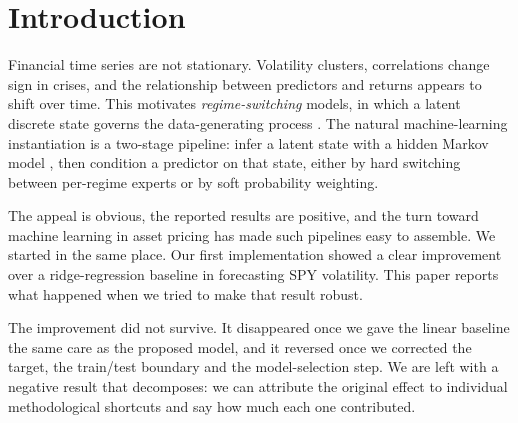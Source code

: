 \documentclass[sigconf,nonacm]{acmart}
\begin{document}

\maketitle

\section{Introduction}

Financial time series are not stationary. Volatility clusters, correlations
change sign in crises, and the relationship between predictors and returns
appears to shift over time. This motivates \emph{regime-switching} models, in
which a latent discrete state governs the data-generating process
\cite{hamilton1989, ang2012regime}. The natural machine-learning instantiation
is a two-stage pipeline: infer a latent state with a hidden Markov model
\cite{rabiner1989}, then condition a predictor on that state, either by hard
switching between per-regime experts or by soft probability weighting.

The appeal is obvious, the reported results are positive, and the turn toward
machine learning in asset pricing \cite{gu2020empirical} has made such pipelines
easy to assemble. We started in the same place. Our first implementation showed a
clear improvement over a ridge-regression baseline in forecasting SPY volatility.
This paper reports what happened when we tried to make that result robust.

The improvement did not survive. It disappeared once we gave the linear baseline
the same care as the proposed model, and it reversed once we corrected the
target, the train/test boundary and the model-selection step. We are left with a
negative result that decomposes: we can attribute the original effect to
individual methodological shortcuts and say how much each one contributed.
\end{document}
